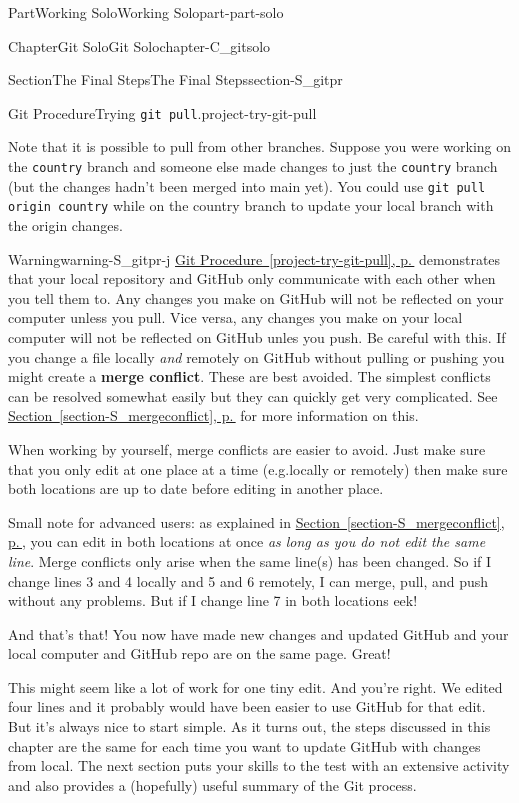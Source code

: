 \documentclass[twoside,10pt,]{book}
\newcommand{\xreffont}{\relax}
\newcommand{\mono}[1]{\texttt{#1}}
\newcommand{\terminology}[1]{\textbf{#1}}
\begin{document}
\begin{partptx}{Part}{Working Solo}{}{Working Solo}{}{}{part-part-solo}
\begin{chapterptx}{Chapter}{Git Solo}{}{Git Solo}{}{}{chapter-C_gitsolo}
\begin{sectionptx}{Section}{The Final Steps}{}{The Final Steps}{}{}{section-S_gitpr}
\begin{project}{Git Procedure}{Trying \mono{git pull}.}{project-try-git-pull}
\begin{enumerate}[font=\bfseries,label=(\alph*),ref=\alph*]
\end{enumerate}%
Note that it is possible to pull from other branches. Suppose you were working on the \mono{country} branch and someone else made changes to just the \mono{country} branch (but the changes hadn't been merged into main yet). You could use \mono{git pull origin country} while on the country branch to update your local branch with the origin changes.%
\end{project}%
\begin{warning}{Warning}{}{warning-S_gitpr-j}%
%
\hyperref[project-try-git-pull]{Git Procedure~{\xreffont\ref{project-try-git-pull}}, p.\,\pageref{project-try-git-pull}} demonstrates that your local repository and GitHub only communicate with each other when you tell them to. Any changes you make on GitHub will not be reflected on your computer unless you pull. Vice versa, any changes you make on your local computer will not be reflected on GitHub unles you push. Be careful with this. If you change a file locally \emph{and} remotely on GitHub without pulling or pushing you might create a \terminology{merge conflict}. These are best avoided. The simplest conflicts can be resolved somewhat easily but they can quickly get very complicated. See \hyperref[section-S_mergeconflict]{Section~{\xreffont\ref{section-S_mergeconflict}}, p.\,\pageref{section-S_mergeconflict}} for more information on this.%
\par
When working by yourself, merge conflicts are easier to avoid. Just make sure that you only edit at one place at a time (e.g.\@ locally or remotely) then make sure both locations are up to date before editing in another place.%
\par
Small note for advanced users: as explained in \hyperref[section-S_mergeconflict]{Section~{\xreffont\ref{section-S_mergeconflict}}, p.\,\pageref{section-S_mergeconflict}}, you can edit in both locations at once \emph{as long as you do not edit the same line}. Merge conflicts only arise when the same line(s) has been changed. So if I change lines 3 and 4 locally and 5 and 6 remotely, I can merge, pull, and push without any problems. But if I change line 7 in both locations \textellipsis{} eek!%
\end{warning}
And that's that! You now have made new changes and updated GitHub and your local computer and GitHub repo are on the same page. Great!%
\par
This might seem like a lot of work for one tiny edit. And you're right. We edited four lines and it probably would have been easier to use GitHub for that edit. But it's always nice to start simple. As it turns out, the steps discussed in this chapter are the same for each time you want to update GitHub with changes from local. The next section puts your skills to the test with an extensive activity and also provides a (hopefully) useful summary of the Git process.%

\end{sectionptx}
\end{chapterptx}
\end{partptx}
\end{document}

